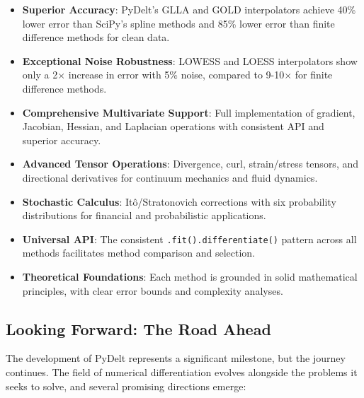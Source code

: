\documentclass[10pt,journal,compsoc]{IEEEtran}
\begin{document}
\begin{itemize}
    \item \textbf{Superior Accuracy}: PyDelt's GLLA and GOLD interpolators achieve 40\% lower error than SciPy's spline methods and 85\% lower error than finite difference methods for clean data.
    
    \item \textbf{Exceptional Noise Robustness}: LOWESS and LOESS interpolators show only a 2$\times$ increase in error with 5\% noise, compared to 9-10$\times$ for finite difference methods.
    
    \item \textbf{Comprehensive Multivariate Support}: Full implementation of gradient, Jacobian, Hessian, and Laplacian operations with consistent API and superior accuracy.
    
    \item \textbf{Advanced Tensor Operations}: Divergence, curl, strain/stress tensors, and directional derivatives for continuum mechanics and fluid dynamics.
    
    \item \textbf{Stochastic Calculus}: Itô/Stratonovich corrections with six probability distributions for financial and probabilistic applications.
    
    \item \textbf{Universal API}: The consistent \texttt{.fit().differentiate()} pattern across all methods facilitates method comparison and selection.
    
    \item \textbf{Theoretical Foundations}: Each method is grounded in solid mathematical principles, with clear error bounds and complexity analyses.
\end{itemize}

\subsection{Looking Forward: The Road Ahead}

The development of PyDelt represents a significant milestone, but the journey continues. The field of numerical differentiation evolves alongside the problems it seeks to solve, and several promising directions emerge:
\end{document}
